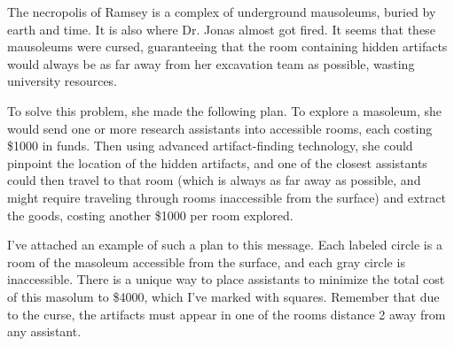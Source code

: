 The necropolis of Ramsey is a complex of underground mausoleums, buried by earth and time.
It is also where Dr. Jonas almost got fired. It seems that these mausoleums were cursed,
guaranteeing that the room containing hidden artifacts would always be as far away from her
excavation team as possible, wasting university resources.

To solve this problem, she made the following plan. To explore a masoleum, she would
send one or more research assistants into accessible rooms, each costing \$1000 in funds.
Then using advanced artifact-finding technology, she could pinpoint the location of the
hidden artifacts, and one of the closest assistants could then travel to that room 
(which is always as far away as possible, and might require traveling
through rooms inaccessible from the surface) and
extract the goods, costing another \$1000 per room explored.

I've attached an example of such a plan to this message. Each labeled circle
is a room of the masoleum accessible from the surface, and each gray circle
is inaccessible. There is a unique way to place assistants to minimize the total
cost of this masolum to \$4000, which I've marked with squares. Remember
that due to the curse, the artifacts must appear in one of the rooms
distance 2 away from any assistant.

